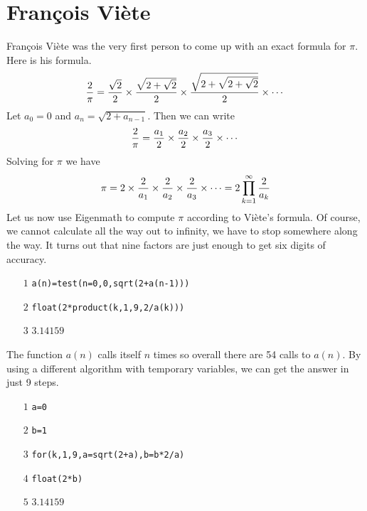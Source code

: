 \documentclass[12pt,openany]{report}
\begin{document}
\section*{Fran\c cois Vi\`ete}
Fran\c cois Vi\`ete was the very first person to come up with an exact formula for $\pi$.
Here is his formula.
\begin{displaymath}
{2\over\pi}={\sqrt2\over2}\times{\sqrt{2+\sqrt2}\over2}\times
{\sqrt{2+\sqrt{2+\sqrt2}}\over2}\times\cdots
\end{displaymath}
Let $a_0=0$ and $a_{n}=\sqrt{2+a_{n-1}}$.
Then we can write
\begin{displaymath}
{2\over\pi}={a_1\over2}\times{a_2\over2}\times
{a_3\over2}\times\cdots
\end{displaymath}
%
Solving for $\pi$ we have
\begin{displaymath}
\pi=2\times{2\over a_1}\times{2\over a_2}\times{2\over a_3}\times\cdots=2\prod_{k=1}^\infty
{2\over a_k}
\end{displaymath}
%
Let us now use Eigenmath to compute $\pi$ according to Vi\`ete's formula.
Of course, we cannot calculate all the way out to infinity, we have to stop somewhere
along the way.
It turns out that nine factors are just enough to get six digits of accuracy.
\begin{itemize}
\item[$\scriptstyle1$]{\tt a(n)=test(n=0,0,sqrt(2+a(n-1)))}
\item[$\scriptstyle2$]{\tt float(2*product(k,1,9,2/a(k)))}
\item[$\scriptstyle3$]\hspace{50pt} $3.14159$
\end{itemize}
The function $a(n)$ calls itself $n$ times so overall there are
54 calls to $a(n)$.
By using a different algorithm with temporary variables, we can get the answer in just 9 steps.
\begin{itemize}
\item[$\scriptstyle1$]{\tt a=0}
\item[$\scriptstyle2$]{\tt b=1}
\item[$\scriptstyle3$]{\tt for(k,1,9,a=sqrt(2+a),b=b*2/a)}
\item[$\scriptstyle4$]{\tt float(2*b)}
\item[$\scriptstyle5$]\hspace{50pt} $3.14159$
\end{itemize}
\end{document}
